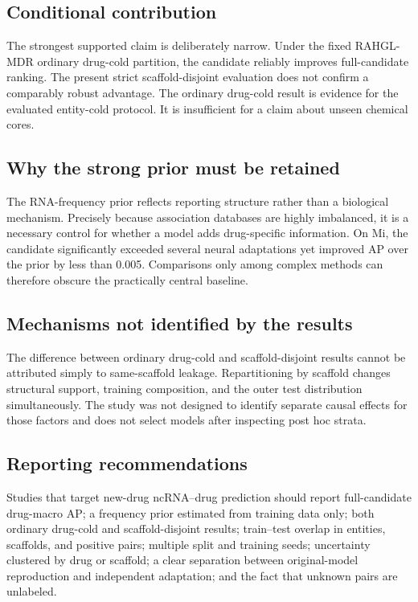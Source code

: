 \documentclass[10pt]{article}
\begin{document}
\subsection{Conditional contribution}

The strongest supported claim is deliberately narrow. Under the fixed RAHGL-MDR ordinary drug-cold partition, the candidate reliably improves full-candidate ranking. The present strict scaffold-disjoint evaluation does not confirm a comparably robust advantage. The ordinary drug-cold result is evidence for the evaluated entity-cold protocol. It is insufficient for a claim about unseen chemical cores.

\subsection{Why the strong prior must be retained}

The RNA-frequency prior reflects reporting structure rather than a biological mechanism. Precisely because association databases are highly imbalanced, it is a necessary control for whether a model adds drug-specific information. On Mi, the candidate significantly exceeded several neural adaptations yet improved AP over the prior by less than 0.005. Comparisons only among complex methods can therefore obscure the practically central baseline.

\subsection{Mechanisms not identified by the results}

The difference between ordinary drug-cold and scaffold-disjoint results cannot be attributed simply to same-scaffold leakage. Repartitioning by scaffold changes structural support, training composition, and the outer test distribution simultaneously. The study was not designed to identify separate causal effects for those factors and does not select models after inspecting post hoc strata.

\subsection{Reporting recommendations}

Studies that target new-drug ncRNA--drug prediction should report full-candidate drug-macro AP; a frequency prior estimated from training data only; both ordinary drug-cold and scaffold-disjoint results; train--test overlap in entities, scaffolds, and positive pairs; multiple split and training seeds; uncertainty clustered by drug or scaffold; a clear separation between original-model reproduction and independent adaptation; and the fact that unknown pairs are unlabeled.
\end{document}
